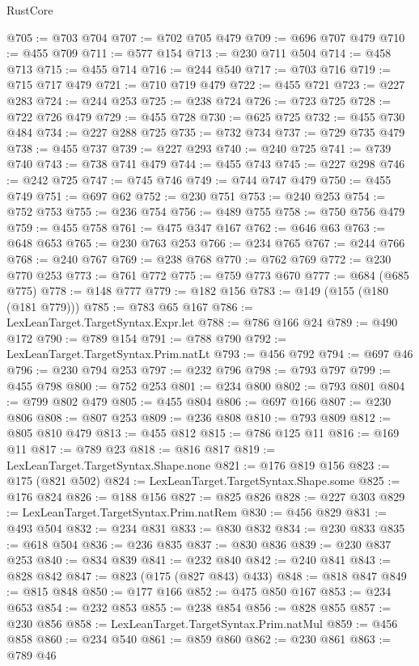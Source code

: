 \begin{lexlean}{RustCore}
\begin{coremodule}
@705 := @703 @704
@707 := @702 @705 @479
@709 := @696 @707 @479
@710 := @455 @709
@711 := @577 @154
@713 := @230 @711 @504
@714 := @458 @713
@715 := @455 @714
@716 := @244 @540
@717 := @703 @716
@719 := @715 @717 @479
@721 := @710 @719 @479
@722 := @455 @721
@723 := @227 @283
@724 := @244 @253
@725 := @238 @724
@726 := @723 @725
@728 := @722 @726 @479
@729 := @455 @728
@730 := @625 @725
@732 := @455 @730 @484
@734 := @227 @288 @725
@735 := @732 @734
@737 := @729 @735 @479
@738 := @455 @737
@739 := @227 @293
@740 := @240 @725
@741 := @739 @740
@743 := @738 @741 @479
@744 := @455 @743
@745 := @227 @298
@746 := @242 @725
@747 := @745 @746
@749 := @744 @747 @479
@750 := @455 @749
@751 := @697 @62
@752 := @230 @751
@753 := @240 @253
@754 := @752 @753
@755 := @236 @754
@756 := @489 @755
@758 := @750 @756 @479
@759 := @455 @758
@761 := @475 @347 @167
@762 := @646 @63
@763 := @648 @653
@765 := @230 @763 @253
@766 := @234 @765
@767 := @244 @766
@768 := @240 @767
@769 := @238 @768
@770 := @762 @769
@772 := @230 @770 @253
@773 := @761 @772
@775 := @759 @773 @670
@777 := @684 (@685 @775)
@778 := @148 @777
@779 := @182 @156
@783 := @149 (@155 (@180 (@181 @779)))
@785 := @783 @65 @167
@786 := LexLeanTarget.TargetSyntax.Expr.let
@788 := @786 @166 @24
@789 := @490 @172
@790 := @789 @154
@791 := @788 @790
@792 := LexLeanTarget.TargetSyntax.Prim.natLt
@793 := @456 @792
@794 := @697 @46
@796 := @230 @794 @253
@797 := @232 @796
@798 := @793 @797
@799 := @455 @798
@800 := @752 @253
@801 := @234 @800
@802 := @793 @801
@804 := @799 @802 @479
@805 := @455 @804
@806 := @697 @166
@807 := @230 @806
@808 := @807 @253
@809 := @236 @808
@810 := @793 @809
@812 := @805 @810 @479
@813 := @455 @812
@815 := @786 @125 @11
@816 := @169 @11
@817 := @789 @23
@818 := @816 @817
@819 := LexLeanTarget.TargetSyntax.Shape.none
@821 := @176 @819 @156
@823 := @175 (@821 @502)
@824 := LexLeanTarget.TargetSyntax.Shape.some
@825 := @176 @824
@826 := @188 @156
@827 := @825 @826
@828 := @227 @303
@829 := LexLeanTarget.TargetSyntax.Prim.natRem
@830 := @456 @829
@831 := @493 @504
@832 := @234 @831
@833 := @830 @832
@834 := @230 @833
@835 := @618 @504
@836 := @236 @835
@837 := @830 @836
@839 := @230 @837 @253
@840 := @834 @839
@841 := @232 @840
@842 := @240 @841
@843 := @828 @842
@847 := @823 (@175 (@827 @843) @433)
@848 := @818 @847
@849 := @815 @848
@850 := @177 @166
@852 := @475 @850 @167
@853 := @234 @653
@854 := @232 @853
@855 := @238 @854
@856 := @828 @855
@857 := @230 @856
@858 := LexLeanTarget.TargetSyntax.Prim.natMul
@859 := @456 @858
@860 := @234 @540
@861 := @859 @860
@862 := @230 @861
@863 := @789 @46

\end{coremodule}
\end{lexlean}
